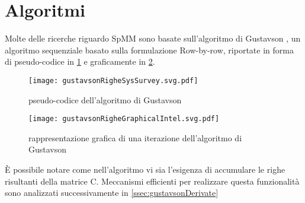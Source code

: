\section{Algoritmi}
Molte delle ricerche riguardo SpMM sono basate sull'algoritmo di Gustavson \cite{gustavson},
un algoritmo sequenziale basato sulla formulazione Row-by-row, riportate in forma di pseudo-codice 
in \ref{figCode:gustavsonRigheSysSurvey} e graficamente in \ref{fig:gustavsonRigheGraphicalIntel}.\\

\begin{figure}[H]
  \caption[pseudocodice Gustavson]{pseudo-codice dell'algoritmo di Gustavson}
  \centering \texttt{[image: gustavsonRigheSysSurvey.svg.pdf]} \decoRule
  \label{figCode:gustavsonRigheSysSurvey}
\end{figure}
\begin{figure}[H]
  \caption[rappresentazione Gustavson]{rappresentazione grafica di una iterazione dell'algoritmo di Gustavson}
  \centering \texttt{[image: gustavsonRigheGraphicalIntel.svg.pdf]} \decoRule
  \label{fig:gustavsonRigheGraphicalIntel}
\end{figure}
È possibile notare come nell'algoritmo vi sia l'esigenza di accumulare le righe
risultanti della matrice C. Meccanismi efficienti per realizzare questa
funzionalità sono analizzati successivamente in \ref{ssec:gustavsonDerivate} %
\\


